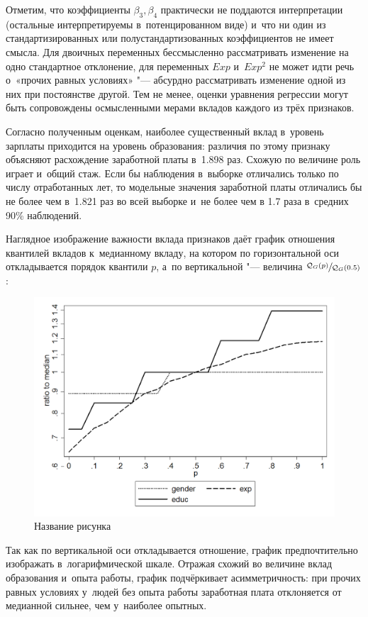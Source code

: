 \documentclass[11pt]{article}
\begin{document}
Отметим, что коэффициенты $\beta_3, \beta_4$ практически не поддаются интерпретации (остальные интерпретируемы в~потенцированном виде) и~что ни один из стандартизированных или полустандартизованных коэффициентов не имеет смысла. Для двоичных переменных бессмысленно рассматривать изменение на одно стандартное отклонение, для переменных $Exp$ и~$Exp^2$ не может идти речь о~«прочих равных условиях» "--- абсурдно рассматривать изменение одной из них при постоянстве другой. Тем не менее, оценки уравнения регрессии могут быть сопровождены осмысленными мерами вкладов каждого из трёх признаков.

Согласно полученным оценкам, наиболее существенный вклад в~уровень зарплаты приходится на уровень образования: различия по этому признаку объясняют расхождение заработной платы в~1.898 раз. Схожую по величине роль играет и~общий стаж. Если бы наблюдения в~выборке отличались только по числу отработанных лет, то модельные значения заработной платы отличались бы не более чем в~1.821 раз во всей выборке и~не более чем в 1.7 раза в~средних 90\% наблюдений. 

Наглядное изображение важности вклада признаков даёт график отношения квантилей вкладов к~медианному вкладу, на котором по горизонтальной оси откладывается порядок квантили $p$, а~по вертикальной "--- величина $\sfrac{\mathcal{Q}_G(p)}{\mathcal{Q}_G(0.5)}$:

\begin{figure}[htbp]
	\centering
	\includegraphics[width=12cm]{wageeq.png}
	\caption{Название рисунка}\label{fig:wageeq}
\end{figure} 

Так как по вертикальной оси откладывается отношение, график предпочтительно изображать в~логарифмической шкале. Отражая схожий во величине вклад образования и~опыта работы, график подчёркивает асимметричность: при прочих равных условиях у~людей без опыта работы заработная плата отклоняется от медианной сильнее, чем у~наиболее опытных.
\end{document}
